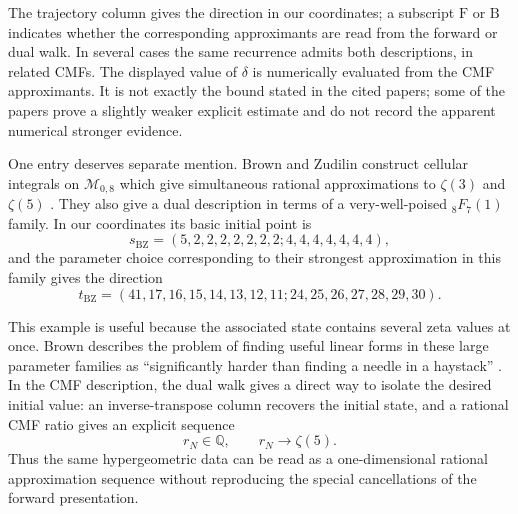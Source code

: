\documentclass[oneside,english,11pt]{amsart}
\begin{document}
The trajectory column gives the direction in our coordinates; a subscript
$\mathrm F$ or $\mathrm B$ indicates whether the corresponding approximants
are read from the forward or dual walk.  In several cases the same
recurrence admits both descriptions, in related CMFs.  The displayed value
of $\delta$ is numerically evaluated from the CMF approximants.  It is not
exactly the bound stated in the cited papers; some of the papers
prove a slightly weaker explicit estimate and do not record the apparent
numerical stronger evidence. 


One entry deserves separate mention.  Brown and Zudilin construct cellular
integrals on $\mathcal M_{0,8}$ which give simultaneous rational
approximations to $\zeta(3)$ and $\zeta(5)$
\cite{brownZudilin2022zeta5}.  They also give a dual description in terms of
a very-well-poised ${}_8F_7(1)$ family.  In our coordinates its basic initial
point is
\[
    s_{\mathrm{BZ}}
    =(5,2,2,2,2,2,2,2;4,4,4,4,4,4,4),
\]
and the parameter choice corresponding to their strongest approximation in
this family gives the direction
\[
    t_{\mathrm{BZ}}
    =(41,17,16,15,14,13,12,11;
      24,25,26,27,28,29,30).
\]

This example is useful because the associated state contains several zeta
values at once.  Brown describes the problem of finding useful linear forms
in these large parameter families as ``significantly harder than finding a
needle in a haystack'' \cite{brown2014irrationality}.  In the CMF
description, the dual walk gives a direct way to isolate the desired initial
value: an inverse-transpose column recovers the initial state, and a rational
CMF ratio gives an explicit sequence
\[
    r_N\in\mathbb Q,
    \qquad
    r_N\longrightarrow\zeta(5).
\]
Thus the same hypergeometric data can be read as a one-dimensional rational
approximation sequence without reproducing the special cancellations of the
forward presentation.

%
\end{document}
